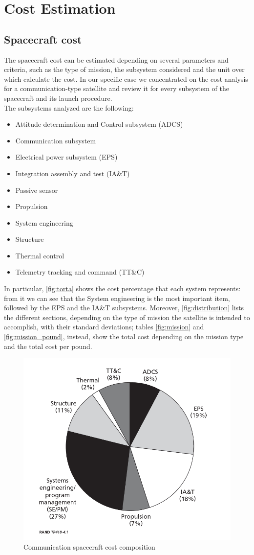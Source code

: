 \documentclass[11pt,a4paper,titlepage]{article}
\begin{document}
\section{Cost Estimation}
	\subsection{Spacecraft cost}
		The spacecraft cost can be estimated depending on several parameters and criteria, such as the type of mission, the 				subsystem considered and the unit over which calculate the cost. In our specific case we concentrated on the cost analysis 		for a communication-type satellite and review it for every subsystem of the spacecraft and its launch procedure.\\
		
		The subsystems analyzed  are the following:
		\begin{itemize}
			\item Attitude determination and Control subsystem (ADCS)
			\item Communication subsystem
			\item Electrical power subsystem (EPS)
			\item Integration assembly and test (IA\&T)
			\item Passive sensor
			\item Propulsion
			\item System engineering
			\item Structure
			\item Thermal control
			\item Telemetry tracking and command (TT\&C)
		\end{itemize}
		In particular, \autoref{fig:torta} shows the cost percentage that each system represents: from it we can see that the 				System engineering is the most important item, followed by the EPS and the IA\&T subsystems. Moreover, 						\autoref{fig:distribution} lists the different sections, depending on the type of mission the satellite is intended to 					accomplish, with their standard deviations; tables \ref{fig:mission} and \ref{fig:mission_pound}, instead, show the total 			cost depending on the mission type and the total cost per pound.
		
		\begin{figure}
			\centering
			\includegraphics[width = .7\textwidth]{Torta.png}
			\caption{Communication spacecraft cost composition}
			\label{fig:torta}
		\end{figure}
		
\end{document}
